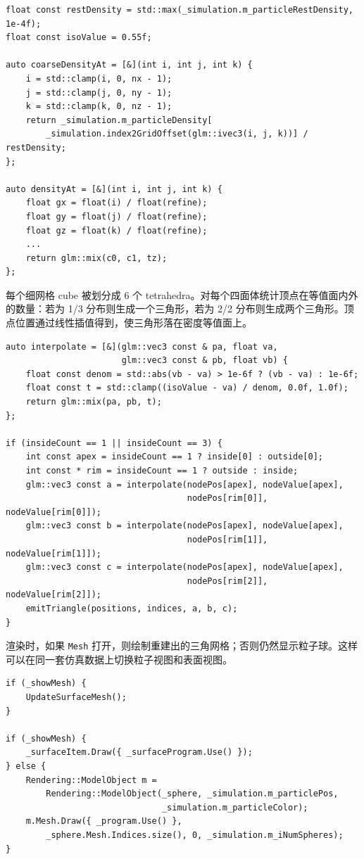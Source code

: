 \documentclass[UTF8,a4paper,11pt]{ctexart}
\begin{document}
\begin{lstlisting}[style=cppstyle,caption={密度场三线性采样}]
float const restDensity = std::max(_simulation.m_particleRestDensity, 1e-4f);
float const isoValue = 0.55f;

auto coarseDensityAt = [&](int i, int j, int k) {
    i = std::clamp(i, 0, nx - 1);
    j = std::clamp(j, 0, ny - 1);
    k = std::clamp(k, 0, nz - 1);
    return _simulation.m_particleDensity[
        _simulation.index2GridOffset(glm::ivec3(i, j, k))] / restDensity;
};

auto densityAt = [&](int i, int j, int k) {
    float gx = float(i) / float(refine);
    float gy = float(j) / float(refine);
    float gz = float(k) / float(refine);
    ...
    return glm::mix(c0, c1, tz);
};
\end{lstlisting}

每个细网格 cube 被划分成 6 个 tetrahedra。对每个四面体统计顶点在等值面内外的数量：若为 1/3 分布则生成一个三角形，若为 2/2 分布则生成两个三角形。顶点位置通过线性插值得到，使三角形落在密度等值面上。

\begin{lstlisting}[style=cppstyle,caption={四面体等值面提取}]
auto interpolate = [&](glm::vec3 const & pa, float va,
                       glm::vec3 const & pb, float vb) {
    float const denom = std::abs(vb - va) > 1e-6f ? (vb - va) : 1e-6f;
    float const t = std::clamp((isoValue - va) / denom, 0.0f, 1.0f);
    return glm::mix(pa, pb, t);
};

if (insideCount == 1 || insideCount == 3) {
    int const apex = insideCount == 1 ? inside[0] : outside[0];
    int const * rim = insideCount == 1 ? outside : inside;
    glm::vec3 const a = interpolate(nodePos[apex], nodeValue[apex],
                                    nodePos[rim[0]], nodeValue[rim[0]]);
    glm::vec3 const b = interpolate(nodePos[apex], nodeValue[apex],
                                    nodePos[rim[1]], nodeValue[rim[1]]);
    glm::vec3 const c = interpolate(nodePos[apex], nodeValue[apex],
                                    nodePos[rim[2]], nodeValue[rim[2]]);
    emitTriangle(positions, indices, a, b, c);
}
\end{lstlisting}

渲染时，如果 \texttt{Mesh} 打开，则绘制重建出的三角网格；否则仍然显示粒子球。这样可以在同一套仿真数据上切换粒子视图和表面视图。

\begin{lstlisting}[style=cppstyle,caption={粒子视图和表面视图切换}]
if (_showMesh) {
    UpdateSurfaceMesh();
}

if (_showMesh) {
    _surfaceItem.Draw({ _surfaceProgram.Use() });
} else {
    Rendering::ModelObject m =
        Rendering::ModelObject(_sphere, _simulation.m_particlePos,
                               _simulation.m_particleColor);
    m.Mesh.Draw({ _program.Use() },
        _sphere.Mesh.Indices.size(), 0, _simulation.m_iNumSpheres);
}
\end{lstlisting}
\end{document}
